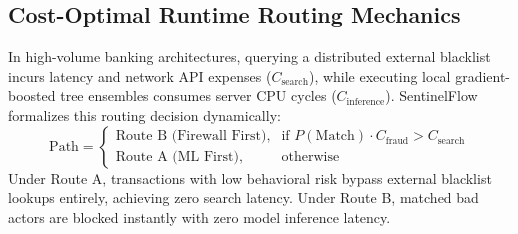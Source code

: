 \documentclass[conference]{IEEEtran}
\begin{document}
\subsection{Cost-Optimal Runtime Routing Mechanics}
In high-volume banking architectures, querying a distributed external blacklist incurs latency and network API expenses ($C_{\text{search}}$), while executing local gradient-boosted tree ensembles consumes server CPU cycles ($C_{\text{inference}}$). SentinelFlow formalizes this routing decision dynamically:
\begin{equation}
\text{Path} = \begin{cases} 
\text{Route B (Firewall First)}, & \text{if } P(\text{Match}) \cdot C_{\text{fraud}} > C_{\text{search}} \\
\text{Route A (ML First)}, & \text{otherwise}
\end{cases}
\label{eq:routing}
\end{equation}
Under Route A, transactions with low behavioral risk bypass external blacklist lookups entirely, achieving zero search latency. Under Route B, matched bad actors are blocked instantly with zero model inference latency.
\end{document}
